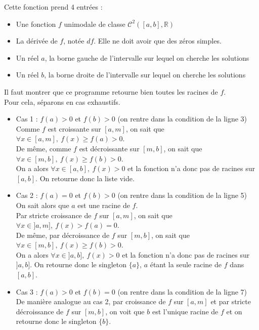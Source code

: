 \documentclass[a4paper, 12pt]{article}
\begin{document}
Cette fonction prend 4 entrées :
\begin{itemize}
    \item Une fonction \( f \) unimodale de classe \( \mathcal{C}^2([a, b], \mathbb{R}) \)
    \item La dérivée de \( f \), notée \( df \). Elle ne doit avoir que des zéros simples.
    \item Un réel \( a \), la borne gauche de l'intervalle sur lequel on cherche les solutions
    \item Un réel \( b \), la borne droite de l'intervalle sur lequel on cherche les solutions
\end{itemize}
Il faut montrer que ce programme retourne bien toutes les racines de \( f \). \\
Pour cela, séparons en cas exhaustifs.
\begin{itemize}

    \item Cas 1 : \( f(a) > 0 \) et \( f(b) > 0 \) \quad (on rentre dans la condition de la ligne 3) \\
Comme \( f \) est croissante sur \( [a, m] \), on sait que \( \forall x \in [a, m],~ f(x) \geq f(a) > 0 \). \\
De même, comme \( f \) est décroissante sur \( [m, b] \), on sait que \( \forall x \in [m, b],~ f(x) \geq f(b) > 0 \). \\
On a alors \( \forall x \in [a, b],~ f(x) > 0 \) et la fonction n'a donc pas de racines sur \( [a, b] \). On retourne donc la liste vide.

    \item Cas 2 : \( f(a) = 0 \) et \( f(b) > 0 \) \quad (on rentre dans la condition de la ligne 5) \\
On sait alors que \( a \) est une racine de \( f \). \\
Par stricte croissance de \( f \) sur \( [a, m] \), on sait que \( \forall x \in ]a, m],~ f(x) > f(a) = 0 \). \\
De même, par décroissance de \( f \) sur \( [m, b] \), on sait que \( \forall x \in [m, b],~ f(x) \geq f(b) > 0 \). \\
On a alors \( \forall x \in ]a, b],~ f(x) > 0 \) et la fonction n'a donc pas de racines sur \( ]a, b] \). On retourne donc le singleton \( \{a\} \), \( a \) étant la seule racine de \( f \) dans \( [a, b] \).

    \item Cas 3 : \( f(a) > 0 \) et \( f(b) = 0 \) \quad (on rentre dans la condition de la ligne 7) \\
De manière analogue au cas 2, par croissance de \( f \) sur \( [a, m] \) et par stricte décroissance de \( f \) sur \( [m, b] \), on voit que \( b \) est l'unique racine de \( f \) et on retourne donc le singleton \( \{b\} \).


\end{itemize}
\end{document}
